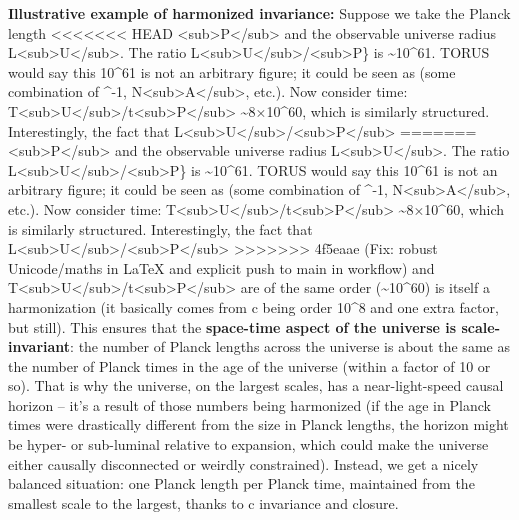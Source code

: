 \documentclass[]{article}
\begin{document}
\textbf{Illustrative example of harmonized invariance:} Suppose we take
the Planck length
<<<<<<< HEAD
\ell\textless sub\textgreater P\textless/sub\textgreater{} and the
observable universe radius
L\textless sub\textgreater U\textless/sub\textgreater. The ratio
L\textless sub\textgreater U\textless/sub\textgreater/\ell\textless sub\textgreater P\}
is \textasciitilde10\^{}61. TORUS would say this 10\^{}61 is not an
arbitrary figure; it could be seen as (some combination of \alpha\^{}-1,
N\textless sub\textgreater A\textless/sub\textgreater, etc.). Now
consider time:
T\textless sub\textgreater U\textless/sub\textgreater/t\textless sub\textgreater P\textless/sub\textgreater{}
\textasciitilde8×10\^{}60, which is similarly structured. Interestingly,
the fact that
L\textless sub\textgreater U\textless/sub\textgreater/\ell\textless sub\textgreater P\textless/sub\textgreater{}
=======
\ell\textless{}sub\textgreater{}P\textless{}/sub\textgreater{} and the
observable universe radius
L\textless{}sub\textgreater{}U\textless{}/sub\textgreater{}. The ratio
L\textless{}sub\textgreater{}U\textless{}/sub\textgreater{}/\ell\textless{}sub\textgreater{}P\}
is \textasciitilde{}10\^{}61. TORUS would say this 10\^{}61 is not an
arbitrary figure; it could be seen as (some combination of \alpha\^{}-1,
N\textless{}sub\textgreater{}A\textless{}/sub\textgreater{}, etc.). Now
consider time:
T\textless{}sub\textgreater{}U\textless{}/sub\textgreater{}/t\textless{}sub\textgreater{}P\textless{}/sub\textgreater{}
\textasciitilde{}8×10\^{}60, which is similarly structured.
Interestingly, the fact that
L\textless{}sub\textgreater{}U\textless{}/sub\textgreater{}/\ell\textless{}sub\textgreater{}P\textless{}/sub\textgreater{}
>>>>>>> 4f5eaae (Fix: robust Unicode/maths in LaTeX and explicit push to main in workflow)
and
T\textless{}sub\textgreater{}U\textless{}/sub\textgreater{}/t\textless{}sub\textgreater{}P\textless{}/sub\textgreater{}
are of the same order (\textasciitilde{}10\^{}60) is itself a
harmonization (it basically comes from c being order 10\^{}8 and one
extra factor, but still). This ensures that the \textbf{space-time
aspect of the universe is scale-invariant}: the number of Planck lengths
across the universe is about the same as the number of Planck times in
the age of the universe (within a factor of 10 or so). That is why the
universe, on the largest scales, has a near-light-speed causal horizon
-- it's a result of those numbers being harmonized (if the age in Planck
times were drastically different from the size in Planck lengths, the
horizon might be hyper- or sub-luminal relative to expansion, which
could make the universe either causally disconnected or weirdly
constrained). Instead, we get a nicely balanced situation: one Planck
length per Planck time, maintained from the smallest scale to the
largest, thanks to c invariance and closure​.
\end{document}
